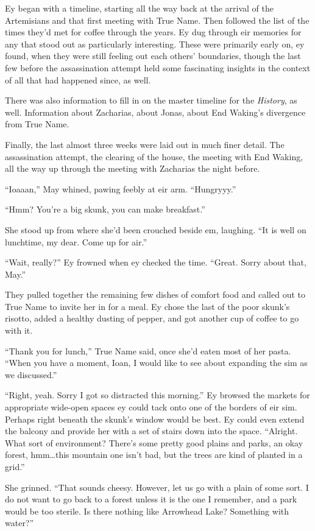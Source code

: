 Ey began with a timeline, starting all the way back at the arrival of the Artemisians and that first meeting with True Name. Then followed the list of the times they'd met for coffee through the years. Ey dug through eir memories for any that stood out as particularly interesting. These were primarily early on, ey found, when they were still feeling out each others' boundaries, though the last few before the assassination attempt held some fascinating insights in the context of all that had happened since, as well.

There was also information to fill in on the master timeline for the \emph{History}, as well. Information about Zacharias, about Jonas, about End Waking's divergence from True Name.

Finally, the last almost three weeks were laid out in much finer detail. The assassination attempt, the clearing of the house, the meeting with End Waking, all the way up through the meeting with Zacharias the night before.

``Ioaaan,'' May whined, pawing feebly at eir arm. ``Hungryyy.''

``Hmm? You're a big skunk, you can make breakfast.''

She stood up from where she'd been crouched beside em, laughing. ``It is well on lunchtime, my dear. Come up for air.''

``Wait, really?'' Ey frowned when ey checked the time. ``Great. Sorry about that, May.''

They pulled together the remaining few dishes of comfort food and called out to True Name to invite her in for a meal. Ey chose the last of the poor skunk's risotto, added a healthy dusting of pepper, and got another cup of coffee to go with it.

``Thank you for lunch,'' True Name said, once she'd eaten most of her pasta. ``When you have a moment, Ioan, I would like to see about expanding the sim as we discussed.''

``Right, yeah. Sorry I got so distracted this morning.'' Ey browsed the markets for appropriate wide-open spaces ey could tack onto one of the borders of eir sim. Perhaps right beneath the skunk's window would be best. Ey could even extend the balcony and provide her with a set of stairs down into the space. ``Alright. What sort of environment? There's some pretty good plains and parks, an okay forest, hmm\ldots this mountain one isn't bad, but the trees are kind of planted in a grid.''

She grinned. ``That sounds cheesy. However, let us go with a plain of some sort. I do not want to go back to a forest unless it is the one I remember, and a park would be too sterile. Is there nothing like Arrowhead Lake? Something with water?''

